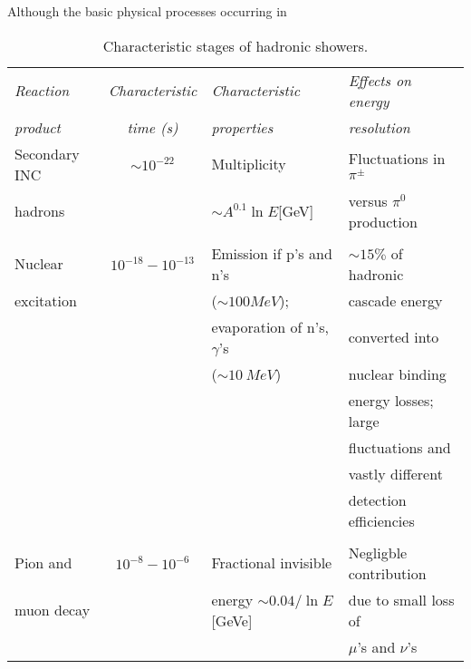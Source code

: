  \label{sec:cascades}

Although the basic physical processes occurring in 


\begin{table}[!hbt]
\caption{Characteristic stages of hadronic showers.}

\hspace{0.5cm}

\label{taul:hetcCharacteristics} %
\centering
\begin{tabular}{lcll}
\hline
\em Reaction     & \em Characteristic  & \em Characteristic             & \em Effects on energy      \\
\em product      & \em time (s)        & \em properties                 & \em resolution             \\[2.5ex] 
\hline
    Secondary INC& $\sim 10^{-22}$     & Multiplicity 	                & Fluctuations in $\pi^\pm$  \\
    hadrons      &    	               & $\sim A^{0.1} \ln E$[GeV]      & versus  $\pi^0$ production \\
		 &                     &                                &                            \\
    Nuclear      & $10^{-18}-10^{-13}$ & Emission if p's and n's        & $\sim 15 \%$ of hadronic   \\
    excitation   &                     & ($\sim 100 MeV$);              & cascade energy             \\
                 &                     & evaporation of n's, $\gamma$'s & converted into             \\
                 &                     & ($\sim 10~MeV$)                & nuclear binding            \\
                 &                     &                                & energy losses; large       \\
                 &                     &                                & fluctuations and           \\
                 &                     &                                & vastly different           \\
                 &                     &                                & detection efficiencies     \\
                 &                     &                                &                            \\
Pion and         & $10^{-8}-10^{-6}$   & Fractional invisible           & Negligble contribution     \\
muon decay       &                     & energy $\sim 0.04/\ln E$[GeVe]  & due to small loss of       \\
                 &                     &                                & $\mu$'s and $\nu$'s        \\
\hline
\end{tabular} 
\end{table}

